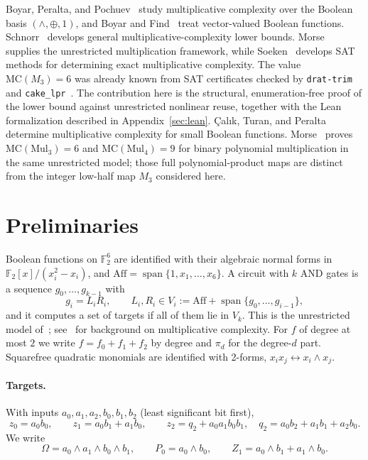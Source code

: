 \documentclass[11pt,a4paper]{article}
\theoremstyle{plain}
\theoremstyle{remark}
\newcommand{\F}{\mathbb F_2}
\newcommand{\Aff}{\mathrm{Aff}}
\newcommand{\Span}{\operatorname{span}}
\begin{document}
Boyar, Peralta, and Pochuev~\cite{bpp} study multiplicative complexity over the Boolean basis $(\wedge,\oplus,1)$, and Boyar and Find~\cite{bf} treat vector-valued Boolean functions. Schnorr~\cite{schnorr} develops general multiplicative-complexity lower bounds. Morse~\cite{morse} supplies the unrestricted multiplication framework, while Soeken~\cite{soeken} develops SAT methods for determining exact multiplicative complexity. The value $\mathrm{MC}(M_3)=6$ was already known from SAT certificates checked by \texttt{drat-trim} and \texttt{cake\_lpr}~\cite{cert}. The contribution here is the structural, enumeration-free proof of the lower bound against unrestricted nonlinear reuse, together with the Lean formalization described in Appendix~\ref{sec:lean}. \c{C}al{\i}k, Turan, and Peralta~\cite{ctp} determine multiplicative complexity for small Boolean functions. Morse~\cite{morse} proves $\mathrm{MC}(\mathrm{Mul}_3)=6$ and $\mathrm{MC}(\mathrm{Mul}_4)=9$ for binary polynomial multiplication in the same unrestricted model; those full polynomial-product maps are distinct from the integer low-half map $M_3$ considered here.

\section{Preliminaries}\label{sec:preliminaries}

Boolean functions on $\F^6$ are identified with their algebraic normal forms in $\F[x]/(x_i^2-x_i)$, and $\Aff=\Span\{1,x_1,\dots,x_6\}$. A circuit with $k$ AND gates is a sequence $g_0,\dots,g_{k-1}$ with
\[
  g_i=L_iR_i,\qquad L_i,R_i\in V_i:=\Aff+\Span\{g_0,\dots,g_{i-1}\},
\]
and it computes a set of targets if all of them lie in $V_k$. This is the unrestricted model of~\cite{morse}; see~\cite{bpp,bf,schnorr} for background on multiplicative complexity. For $f$ of degree at most $2$ we write $f=f_0+f_1+f_2$ by degree and $\pi_d$ for the degree-$d$ part. Squarefree quadratic monomials are identified with 2-forms, $x_ix_j\leftrightarrow x_i\wedge x_j$.

\paragraph{Targets.}
With inputs $a_0,a_1,a_2,b_0,b_1,b_2$ (least significant bit first),
\[
  z_0=a_0b_0,\qquad z_1=a_0b_1+a_1b_0,\qquad z_2=q_2+a_0a_1b_0b_1,\quad q_2=a_0b_2+a_1b_1+a_2b_0 .
\]
We write
\[
  \Omega=a_0\wedge a_1\wedge b_0\wedge b_1,\qquad P_0=a_0\wedge b_0,\qquad Z_1=a_0\wedge b_1+a_1\wedge b_0 .
\]
\end{document}
